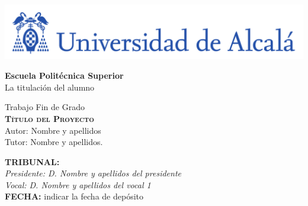 

\begin{center}

\includegraphics[width=15cm]{figuras/logo-uah.pdf}\\
\vspace{0.5cm}


\LARGE  \textbf{Escuela Politécnica Superior}\\


La titulación del alumno\\
\end{center}

\vspace{0.5cm}



\begin{center}
\vspace{1cm}

\LARGE Trabajo Fin de Grado\\

\textbf{\Huge \textsc{{Título del Proyecto}}}\\
\vspace{0.5cm}
\large Autor: Nombre y apellidos\\
Tutor: Nombre y apellidos.\\
\vspace{0.5cm}
\end{center}

\begin{flushleft}
\textbf{TRIBUNAL:}\\
\vspace{1.5cm}
\textit{Presidente: D. Nombre y apellidos del presidente}\\
\vspace{1.5cm}
\textit{Vocal: D. Nombre y apellidos del vocal 1}\\
\vspace{1.5cm}
\textbf{FECHA:} indicar la fecha de depósito\\ 

\end{flushleft}

\newpage
\thispagestyle{empty}
\hspace*{0.5cm}
\newpage

